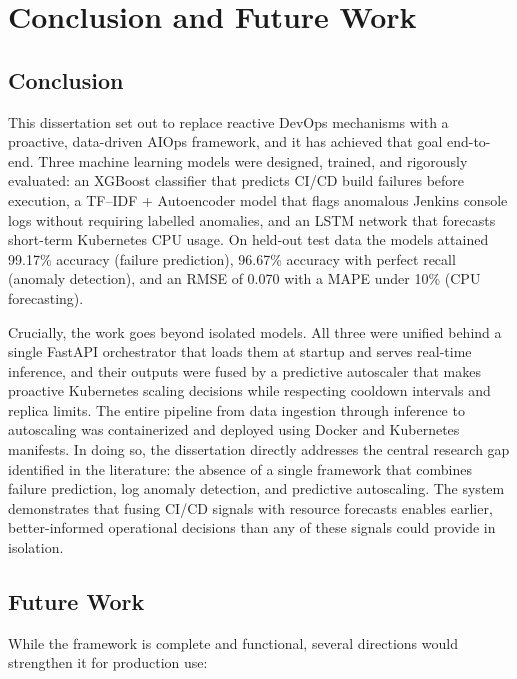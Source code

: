 \documentclass[a4paper,14pt,onecolumn]{report}
\begin{document}
\chapter{Conclusion and Future Work}

\section{Conclusion}

This dissertation set out to replace reactive DevOps mechanisms with a proactive, data-driven AIOps framework, and it has achieved that goal end-to-end. Three machine learning models were designed, trained, and rigorously evaluated: an XGBoost classifier that predicts CI/CD build failures before execution, a TF--IDF + Autoencoder model that flags anomalous Jenkins console logs without requiring labelled anomalies, and an LSTM network that forecasts short-term Kubernetes CPU usage. On held-out test data the models attained 99.17\% accuracy (failure prediction), 96.67\% accuracy with perfect recall (anomaly detection), and an RMSE of 0.070 with a MAPE under 10\% (CPU forecasting).

Crucially, the work goes beyond isolated models. All three were unified behind a single FastAPI orchestrator that loads them at startup and serves real-time inference, and their outputs were fused by a predictive autoscaler that makes proactive Kubernetes scaling decisions while respecting cooldown intervals and replica limits. The entire pipeline from data ingestion through inference to autoscaling was containerized and deployed using Docker and Kubernetes manifests. In doing so, the dissertation directly addresses the central research gap identified in the literature: the absence of a single framework that combines failure prediction, log anomaly detection, and predictive autoscaling. The system demonstrates that fusing CI/CD signals with resource forecasts enables earlier, better-informed operational decisions than any of these signals could provide in isolation.

\section{Future Work}

While the framework is complete and functional, several directions would strengthen it for production use:
\end{document}
